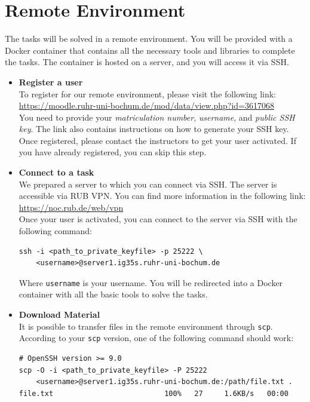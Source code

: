 \documentclass[12pt]{article}
\begin{document}
\section*{Remote Environment}

The tasks will be solved in a remote environment. You will be provided with a
Docker container that contains all the necessary tools and libraries to complete
the tasks. The container is hosted on a server, and you will access it via SSH.

\begin{itemize}
    \item \textbf{Register a user}\\
    To register for our remote environment, please visit the following link:\\
    \url{https://moodle.ruhr-uni-bochum.de/mod/data/view.php?id=3617068}\\    
    You need to provide your \emph{matriculation number}, \emph{username}, and
    \emph{public SSH key}. The link also contains instructions on how to
    generate your SSH key. Once registered, please contact the instructors to
    get your user activated. If you have already registered, you can skip this
    step.
    \item \textbf{Connect to a task}\\
    We prepared a server to which you can connect via SSH. The server is
    accessible via RUB VPN. You can find more information in the following
    link:\\
    \url{https://noc.rub.de/web/vpn}\\
    Once your user is activated, you can connect to the server via SSH with the
    following command:\\
    \begin{lstlisting}
ssh -i <path_to_private_keyfile> -p 25222 \
    <username>@server1.ig35s.ruhr-uni-bochum.de
    \end{lstlisting}
    Where \texttt{username} is your username. You will be redirected into a
    Docker container with all the basic tools to solve the tasks.
    \item \textbf{Download Material}\\
    It is possible to transfer files in the remote environment through
    \texttt{scp}. According to your \texttt{scp} version, one of the following
    command should work:
    \begin{lstlisting}
# OpenSSH version >= 9.0        
scp -O -i <path_to_private_keyfile> -P 25222 
    <username>@server1.ig35s.ruhr-uni-bochum.de:/path/file.txt .
file.txt                          100%   27     1.6KB/s   00:00


\end{lstlisting}
\end{itemize}
\end{document}
